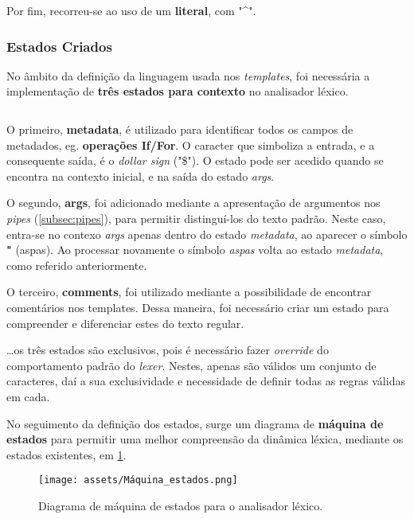 \documentclass[../relatorio.tex]{subfiles}
\begin{document}
    Por fim, recorreu-se ao uso de um \textbf{literal}, com "\^{}".

    \subsubsection{Estados Criados}
    No âmbito da definição da linguagem usada nos \textit{templates},
    foi necessária a implementação de \textbf{três estados para contexto} no
    analisador léxico.

    \inputminted[firstline=13, lastline=17]{py}{../pandoc_lex.py}

    O primeiro, \textbf{metadata}, é utilizado para identificar todos os
    campos de metadados, eg. \textbf{operações If/For}.
    O caracter que simboliza a entrada, e a consequente saída, é o 
    \textit{dollar sign} ("\$").
    O estado pode ser acedido quando se encontra na contexto inicial, e
    na saída do estado \textit{args}.

    O segundo, \textbf{args}, foi adicionado mediante a apresentação 
    de argumentos nos \textit{pipes} (\ref{subsec:pipes}), para permitir 
    distinguí-los do texto padrão. 
    Neste caso, entra-se no contexo \textit{args} apenas dentro do 
    estado \textit{metadata}, ao aparecer o símbolo \textbf{"} (aspas).
    Ao processar novamente o símbolo \textit{aspas} volta ao estado \textit{metadata},
    como referido anteriormente.

    O terceiro, \textbf{comments}, foi utilizado mediante a possibilidade de 
    encontrar comentários nos templates. Dessa maneira, foi necessário criar um 
    estado para compreender e diferenciar estes do texto regular.

    \dots os três estados são exclusivos, pois é necessário fazer \textit{override}
    do comportamento padrão do \textit{lexer}.
    Nestes, apenas são válidos um conjunto de caracteres, daí a sua exclusividade e 
    necessidade de definir todas as regras válidas em cada.

    No seguimento da definição dos estados, surge um diagrama de 
    \textbf{máquina de estados} para permitir uma melhor compreensão da
    dinâmica léxica, mediante os estados existentes, em \ref{fig:state_machine}.

    \begin{figure}[!ht]
        \centering
        \texttt{[image: assets/Máquina\_estados.png]}
        \caption{Diagrama de máquina de estados para o analisador léxico.}
        \label{fig:state_machine}
    \end{figure}
\end{document}
